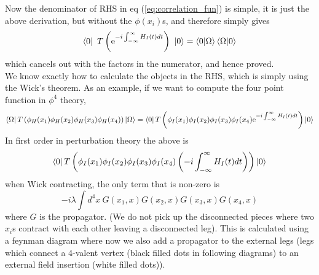 \documentclass[11pt]{article}
\newcommand{\e}{\mathrm{e}}
\numberwithin{equation}{section}
\begin{document}
Now the denominator of RHS in eq (\ref{eq:correlation_fun}) is simple, it is just the above derivation, but without the \(\phi(x_i)\)s, and therefore simply gives 
\begin{equation*}
    \bra{0}~T\left( \e^{-i\int_{-\infty}^{\infty}H_I(t)dt}\right)~\ket{0} = \braket{0|\Omega}\braket{\Omega|0}
\end{equation*}
which cancels out with the factors in the numerator, and hence proved.\\

We know exactly how to calculate the objects in the RHS, which is simply using the Wick's theorem. As an example, if we want to compute the four point function in \(\phi^4\) theory,
\begin{equation*}
    \bra{\Omega} T\left( \phi_H(x_1)\phi_H(x_2)\phi_H(x_3)\phi_H(x_4) \right)\ket{\Omega} = \bra{0}T\left( \phi_I(x_1)\phi_I(x_2)\phi_I(x_3)\phi_I(x_4) \e^{-i\int_{-\infty}^{\infty}H_I(t) dt } \right) \ket{0}
\end{equation*}
In first order in perturbation theory the above is 
\begin{equation*}
    \bra{0}T\left( \phi_I(x_1)\phi_I(x_2)\phi_I(x_3)\phi_I(x_4) \left(-i\int_{-\infty}^{\infty}H_I(t) dt \right) \right) \ket{0}
\end{equation*}
when Wick contracting, the only term that is non-zero is 
\begin{equation*}
    -i\lambda\int d^4x~ G(x_1, x)G(x_2, x)G(x_3, x)G(x_4, x)
\end{equation*}
where \(G\) is the propagator. (We do not pick up the disconnected pieces where two \(x_i\)s contract with each other leaving a disconnected leg). This is calculated using a feynman diagram where now we also add a propagator to the external legs (legs which connect a 4-valent vertex (black filled dots in following diagrams) to an external field insertion (white filled dots)).

\begin{figure}[h]
    \centering 
\end{figure}
\end{document}
